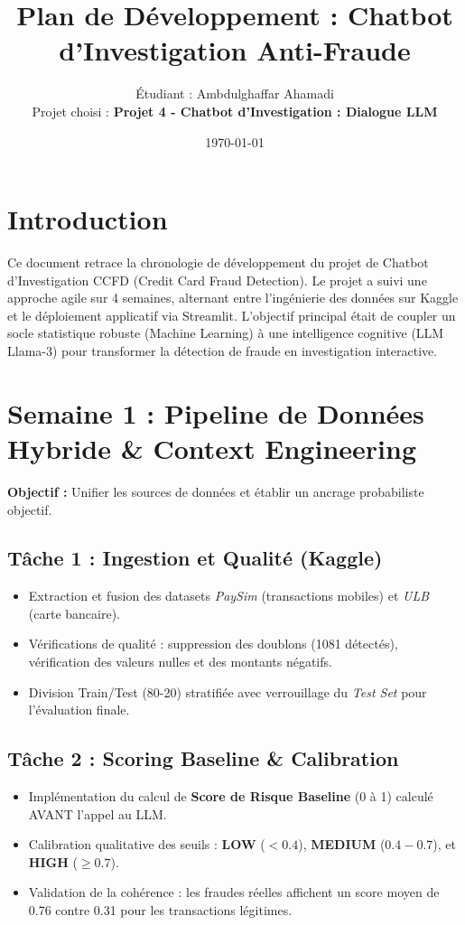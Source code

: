 \documentclass[a4paper,11pt]{article}
\title{\textbf{Plan de Développement : Chatbot d'Investigation Anti-Fraude}}
\author{Étudiant : Ambdulghaffar Ahamadi \\ Projet choisi : \textbf{Projet 4 - Chatbot d'Investigation : Dialogue LLM}}
\date{\today}
\begin{document}
\maketitle

\section*{Introduction}
Ce document retrace la chronologie de développement du projet de Chatbot d'Investigation CCFD (Credit Card Fraud Detection). Le projet a suivi une approche agile sur 4 semaines, alternant entre l'ingénierie des données sur Kaggle et le déploiement applicatif via Streamlit. L'objectif principal était de coupler un socle statistique robuste (Machine Learning) à une intelligence cognitive (LLM Llama-3) pour transformer la détection de fraude en investigation interactive.

\hrulefill

\section{Semaine 1 : Pipeline de Données Hybride \& Context Engineering}
\textbf{Objectif :} Unifier les sources de données et établir un ancrage probabiliste objectif.

\subsection{Tâche 1 : Ingestion et Qualité (Kaggle)}
\begin{itemize}
    \item Extraction et fusion des datasets \textit{PaySim} (transactions mobiles) et \textit{ULB} (carte bancaire).
    \item Vérifications de qualité : suppression des doublons (1081 détectés), vérification des valeurs nulles et des montants négatifs.
    \item Division Train/Test (80-20) stratifiée avec verrouillage du \textit{Test Set} pour l'évaluation finale.
\end{itemize}

\subsection{Tâche 2 : Scoring Baseline \& Calibration}
\begin{itemize}
    \item Implémentation du calcul de \textbf{Score de Risque Baseline} (0 à 1) calculé AVANT l'appel au LLM.
    \item Calibration qualitative des seuils : \textbf{LOW} ($<0.4$), \textbf{MEDIUM} ($0.4-0.7$), et \textbf{HIGH} ($\geq 0.7$).
    \item Validation de la cohérence : les fraudes réelles affichent un score moyen de 0.76 contre 0.31 pour les transactions légitimes.
\end{itemize}
\end{document}
